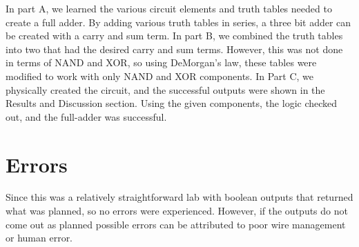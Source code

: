 \documentclass[10pt]{article}
\begin{document}
In part A, we learned the various circuit elements and truth tables needed to create a full adder. By adding various truth tables in series, a three bit adder can be created with a carry and sum term. In part B, we combined the truth tables into two that had the desired carry and sum terms. However, this was not done in terms of NAND and XOR, so using DeMorgan's law, these tables were modified to work with only NAND and XOR components. In Part C, we physically created the circuit, and the successful outputs were shown in the Results and Discussion section. Using the given components, the logic checked out, and the full-adder was successful.	

\medskip


\section{Errors}

Since this was a relatively straightforward lab with boolean outputs that returned what was planned, so no errors were experienced. However, if the outputs do not come out as planned possible errors can be attributed to poor wire management or human error.

\medskip
\end{document}
